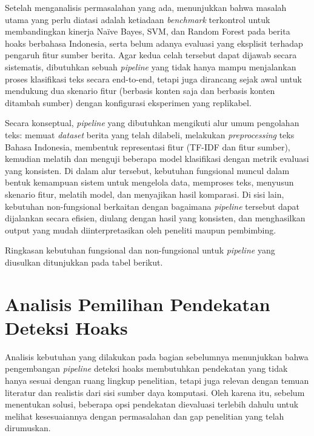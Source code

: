 Setelah menganalisis permasalahan yang ada, menunjukkan bahwa masalah utama yang perlu diatasi adalah ketiadaan \textit{benchmark} terkontrol untuk membandingkan kinerja Naïve Bayes, SVM, dan Random Forest pada berita hoaks berbahasa Indonesia, serta belum adanya evaluasi yang eksplisit terhadap pengaruh fitur sumber berita. Agar kedua celah tersebut dapat dijawab secara sistematis, dibutuhkan sebuah \textit{pipeline} yang tidak hanya mampu menjalankan proses klasifikasi teks secara end-to-end, tetapi juga dirancang sejak awal untuk mendukung dua skenario fitur (berbasis konten saja dan berbasis konten ditambah sumber) dengan konfigurasi eksperimen yang replikabel.

Secara konseptual, \textit{pipeline} yang dibutuhkan mengikuti alur umum pengolahan teks: memuat \textit{dataset} berita yang telah dilabeli, melakukan \textit{preprocessing} teks Bahasa Indonesia, membentuk representasi fitur (TF-IDF dan fitur sumber), kemudian melatih dan menguji beberapa model klasifikasi dengan metrik evaluasi yang konsisten. Di dalam alur tersebut, kebutuhan fungsional muncul dalam bentuk kemampuan sistem untuk mengelola data, memproses teks, menyusun skenario fitur, melatih model, dan menyajikan hasil komparasi. Di sisi lain, kebutuhan non-fungsional berkaitan dengan bagaimana \textit{pipeline} tersebut dapat dijalankan secara efisien, diulang dengan hasil yang konsisten, dan menghasilkan output yang mudah diinterpretasikan oleh peneliti maupun pembimbing.

Ringkasan kebutuhan fungsional dan non-fungsional untuk \textit{pipeline} yang diusulkan ditunjukkan pada tabel berikut.






\section{Analisis Pemilihan Pendekatan Deteksi Hoaks}

Analisis kebutuhan yang dilakukan pada bagian sebelumnya menunjukkan bahwa pengembangan \textit{pipeline} deteksi hoaks membutuhkan pendekatan yang tidak hanya sesuai dengan ruang lingkup penelitian, tetapi juga relevan dengan temuan literatur dan realistis dari sisi sumber daya komputasi. Oleh karena itu, sebelum menentukan solusi, beberapa opsi pendekatan dievaluasi terlebih dahulu untuk melihat kesesuaiannya dengan permasalahan dan gap penelitian yang telah dirumuskan.

